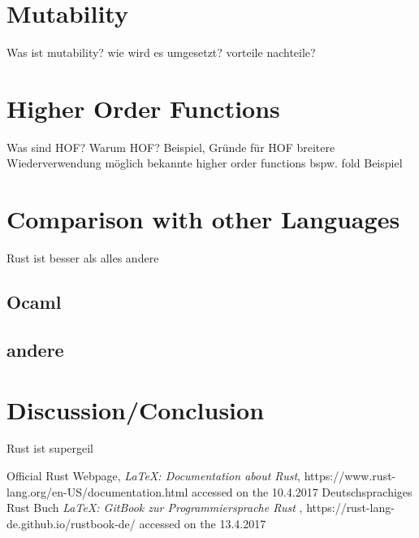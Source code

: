 \documentclass[a4paper,10pt]{scrartcl}
\begin{document}
\section{Mutability} Was ist mutability? wie wird es umgesetzt? vorteile nachteile?

\section{Higher Order Functions} Was sind HOF? Warum HOF? Beispiel, Gründe für HOF
breitere Wiederverwendung möglich
bekannte higher order functions bspw. fold 
Beispiel

\section{Comparison with other Languages}
Rust ist besser als alles andere
\subsection{Ocaml}
\subsection{andere}
\section{Discussion/Conclusion}
Rust ist supergeil

\begin{thebibliography}{9}
  Official Rust Webpage,
  \emph{\LaTeX: Documentation about Rust},
  https://www.rust-lang.org/en-US/documentation.html
  accessed on the 10.4.2017
	Deutschsprachiges Rust Buch
	\emph{\LaTeX: GitBook zur Programmiersprache Rust },
	https://rust-lang-de.github.io/rustbook-de/
	accessed on the 13.4.2017

\end{thebibliography}
\end{document}
